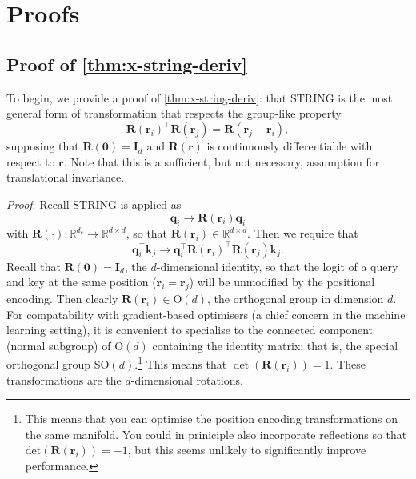 \appendix
\section{Proofs} \label{app:proofs}
\subsection{Proof of \cref{thm:x-string-deriv}}
To begin, we provide a proof of \cref{thm:x-string-deriv}: that STRING is the most general form of transformation that respects the group-like property
\begin{equation} \label{eq:group_exp}
    \mathbf{R}(\boldsymbol{r}_i)^\top \mathbf{R}(\boldsymbol{r}_j) = \mathbf{R}(\boldsymbol{r}_j - \boldsymbol{r}_i),
\end{equation}
supposing that $\mathbf{R}(\mathbf{0})=\mathbf{I}_d$ and $\mathbf{R}(\mathbf{r})$ is continuously differentiable with respect to $\mathbf{r}$.  
Note that this is a sufficient, but not necessary, assumption for translational invariance.

\emph{Proof}.
Recall STRING is applied as
\begin{equation} \label{eq:mat_mult_encoding}
    \mathbf{q}_i \to \mathbf{R}(\boldsymbol{r}_i) \mathbf{q}_i
\end{equation}
with $\mathbf{R}(\cdot): \mathbb{R}^{d_c} \to \mathbb{R}^{d \times d}$, so that $\mathbf{R}(\boldsymbol{r}_i) \in \mathbb{R}^{d \times d}$. 
Then we require that
\begin{equation}
    \mathbf{q}_i^\top \mathbf{k}_j \to \mathbf{q}_i^\top \mathbf{R}(\boldsymbol{r}_i)^\top \mathbf{R}(\boldsymbol{r}_j)\mathbf{k}_j. 
\end{equation}
Recall that $\mathbf{R}(\boldsymbol{0})=\mathbf{I}_d$, the $d$-dimensional identity, so that the logit of a query and key at the same position ($\boldsymbol{r}_i = \boldsymbol{r}_j$) will be unmodified by the positional encoding. 
Then clearly $ \mathbf{R}(\boldsymbol{r}_i) \in \textrm{O}(d)$, the orthogonal group in dimension $d$. 
For compatability with gradient-based optimisers (a chief concern in the machine learning setting), it is convenient to specialise to the connected component (normal subgroup) of $\textrm{O}(d)$ containing the identity matrix: that is, the special orthogonal group $\textrm{SO}(d)$.\footnote{This means that you can optimise the position encoding transformations on the same manifold.
You could in priniciple also incorporate reflections so that $\textrm{det}(\mathbf{R}(\boldsymbol{r}_i))=-1$, but this seems unlikely to significantly improve performance.}
This means that $\det(\mathbf{R}(\boldsymbol{r}_i))=1$.
These transformations are the $d$-dimensional rotations. 

